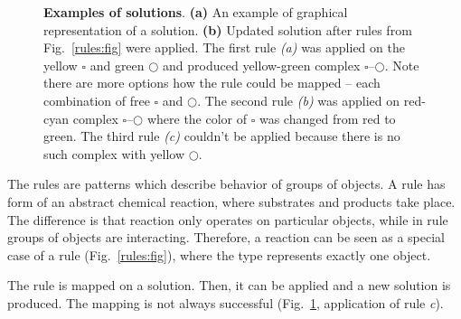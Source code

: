 \documentclass[12pt]{fithesis2}
\begin{document}
\begin{figure}[!h]
\begin{center}
\caption{\textbf{Examples of solutions}. \textbf{(a)} An example of graphical representation of a solution. \textbf{(b)} Updated solution after rules from Fig.~\ref{rules:fig} were applied. The first rule \textit{(a)} was applied on the yellow $\square$ and green $\bigcirc$ and produced yellow-green complex $\square$--$\bigcirc$. Note there are more options how the rule could be mapped -- each combination of free $\square$ and $\bigcirc$. The second rule \textit{(b)} was applied on red-cyan complex $\square$--$\bigcirc$ where the color of $\square$ was changed from red to green. The third rule \textit{(c)} couldn't be applied because there is no such complex with yellow $\bigcirc$. }
\label{solutions:fig}
\end{center}
\end{figure}

The rules are patterns which describe behavior of groups of objects. A rule has form of an abstract chemical reaction, where substrates and products take place. The difference is that reaction only operates on particular objects, while in rule groups of objects are interacting. Therefore, a reaction can be seen as a special case of a rule (Fig.~\ref{rules:fig}), where the type represents exactly one object.

The rule is mapped on a solution. Then, it can be applied and a new solution is produced. The mapping is not always successful (Fig.~\ref{solutions:fig}, application of rule \textit{c}). %
\end{document}
